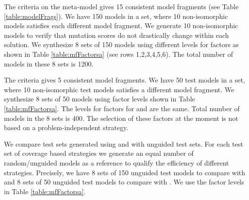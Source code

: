 The {\AllRanges} criteria on the {\UMLCD} meta-model gives 15 consistent model fragments (see Table \ref{table:modelFrags}). We have 150 models in a set, where 10 non-isomorphic models satisfies each different model fragment. We generate 10 non-isomorphic models to verify that mutation scores do not drastically change within each solution. We synthesize 8 sets of 150 models using different levels for factors as shown in Table \ref{table:mfFactorsa} (see rows 1,2,3,4,5,6). The total number of models in these 8 sets is 1200. 

The {\AllPartitions} criteria gives 5 consistent model fragments. We have 50 test models in a set, where 10 non-isomorphic test models satisfies a different model fragment. We synthesize 8 sets of 50 models using factor levels shown in Table \ref{table:mfFactorsa}. The levels for factors for {\AllRanges} and {\AllPartitions} are the same. Total number of models in the 8 sets is 400. The selection of these factors at the moment is not based on a problem-independent strategy. 

We compare test sets generated using {\AllRanges} and {\AllPartitions} with unguided test sets. For each test set of coverage based strategies we generate an equal number of random/unguided models as a reference to qualify the efficiency of different strategies. Precisely, we have 8 sets of 150 unguided test models to compare with {\AllRanges} and 8 sets of 50 unguided test models to compare with {\AllPartitions}. We use the factor levels in Table \ref{table:mfFactorsa}.

